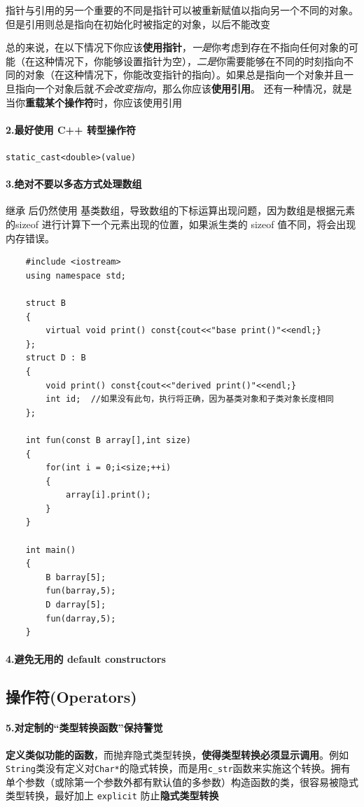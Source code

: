 \documentclass[UTF8,a4paper,12pt]{ctexbook}
\begin{document}
				指针与引用的另一个重要的不同是指针可以被重新赋值以指向另一个不同的对象。但是引用则总是指向在初始化时被指定的对象，以后不能改变
				
				总的来说，在以下情况下你应该\textbf{使用指针}，\textit{一是}你考虑到存在不指向任何对象的可能（在这种情况下，你能够设置指针为空），\textit{二是}你需要能够在不同的时刻指向不同的对象（在这种情况下，你能改变指针的指向）。如果总是指向一个对象并且一旦指向一个对象后就\textit{不会改变指向}，那么你应该\textbf{使用引用}。
				还有一种情况，就是当你\textbf{重载某个操作符}时，你应该使用引用
			\paragraph{2.最好使用 C++ 转型操作符}
				\verb|static_cast<double>(value)|
				
			\paragraph{3.绝对不要以多态方式处理数组} 继承 后仍然使用 基类数组，导致数组的下标运算出现问题，因为数组是根据元素的sizeof 进行计算下一个元素出现的位置，如果派生类的 sizeof 值不同，将会出现内存错误。
				\begin{lstlisting}
	#include <iostream>
	using namespace std;
	
	struct B
	{
		virtual void print() const{cout<<"base print()"<<endl;}
	};
	struct D : B
	{
		void print() const{cout<<"derived print()"<<endl;}
		int id;  //如果没有此句，执行将正确，因为基类对象和子类对象长度相同  
	};
	
	int fun(const B array[],int size)
	{
		for(int i = 0;i<size;++i)
		{
			array[i].print();
		}
	}
	
	int main()
	{
		B barray[5];
		fun(barray,5);
		D darray[5];
		fun(darray,5);
	}
				\end{lstlisting}
			\paragraph{4.避免无用的 default constructors}
			
		\subsection{操作符(Operators)}
			\paragraph{5.对定制的“类型转换函数”保持警觉}
				\textbf{定义类似功能的函数}，而抛弃隐式类型转换，\textbf{使得类型转换必须显示调用}。例如 \verb|String|类没有定义对\verb|Char*|的隐式转换，而是用\verb|c_str|函数来实施这个转换。拥有单个参数（或除第一个参数外都有默认值的多参数）构造函数的类，很容易被隐式类型转换，最好加上 \verb|explicit| 防止\textbf{隐式类型转换}
				
\end{document}
